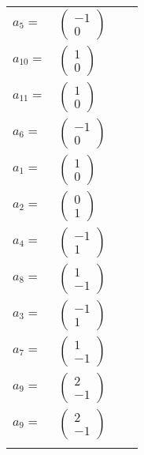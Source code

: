 \documentclass[1p]{elsarticle_modified}
\theoremstyle{definition}
\begin{document}
\begin{tabular}{m{7pt} m{180pt} m{7pt} m{180pt} }
\flushright $a_{5}=$&$\begin{pmatrix}-1\\0\end{pmatrix}$ \\
\flushright $a_{10}=$&$\begin{pmatrix}1\\0\end{pmatrix}$ \\
\flushright $a_{11}=$&$\begin{pmatrix}1\\0\end{pmatrix}$ \\
\flushright $a_{6}=$&$\begin{pmatrix}-1\\0\end{pmatrix}$ \\
\flushright $a_{1}=$&$\begin{pmatrix}1\\0\end{pmatrix}$ \\
\flushright $a_{2}=$&$\begin{pmatrix}0\\1\end{pmatrix}$ \\
\flushright $a_{4}=$&$\begin{pmatrix}-1\\1\end{pmatrix}$ \\
\flushright $a_{8}=$&$\begin{pmatrix}1\\-1\end{pmatrix}$ \\
\flushright $a_{3}=$&$\begin{pmatrix}-1\\1\end{pmatrix}$ \\
\flushright $a_{7}=$&$\begin{pmatrix}1\\-1\end{pmatrix}$ \\
\flushright $a_{9}=$&$\begin{pmatrix}2\\-1\end{pmatrix}$\\ \flushright $a_{9}=$&$\begin{pmatrix}2\\-1\end{pmatrix}$\\&\end{tabular}
\end{document}

